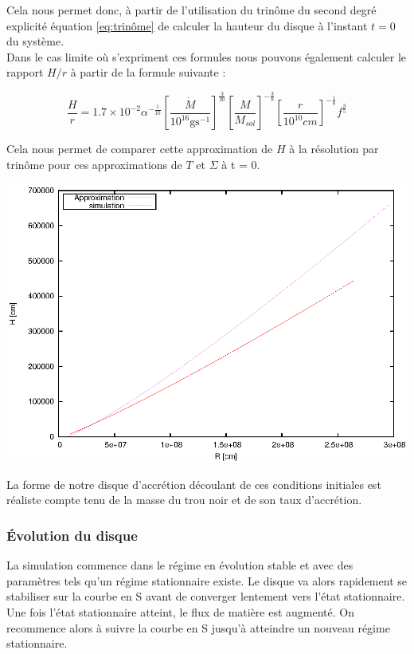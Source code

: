 Cela nous permet donc, à partir de l'utilisation du trinôme du second degré explicité équation \eqref{eq:trinôme} de calculer la hauteur du disque à l'instant $t = 0$ du système. \\

Dans le cas limite où s'expriment ces formules nous pouvons également calculer le rapport $H/r$ à partir de la formule suivante : 

\begin{equation}
	\frac{H}{r} = 1.7 \times 10^{-2}\alpha^{- \frac{1}{10}} \left[ \frac{\dot{M}}{10^{16} \mbox{g} \mbox{s}^{-1}} \right]^{\frac{3}{20}} \left[ \frac{M}{M_{sol}}\right]^{- \frac{3}{8}} \left[ \frac{r}{10^{10} cm}\right]^{- \frac{1}{8}} f^{\frac{3}{5}}
\end{equation}
 
Cela nous permet de comparer cette approximation de $H$ à la résolution par trinôme pour ces approximations de $T$ et $\Sigma$ à t = 0. \\

\begin{center}
	\includegraphics[scale=0.8]{ic_h.eps}
\end{center} 

La forme de notre disque d'accrétion découlant de ces conditions initiales est réaliste compte tenu de la masse du trou noir et de son taux d'accrétion.


\subsubsection{Évolution du disque}

La simulation commence dans le régime en évolution stable et avec des paramètres tels qu'un régime stationnaire existe. Le disque va alors rapidement se stabiliser sur la courbe en S avant de converger lentement vers l'état stationnaire. Une fois l'état stationnaire atteint, le flux de matière est augmenté. On recommence alors à suivre la courbe en S jusqu'à atteindre un nouveau régime stationnaire.

